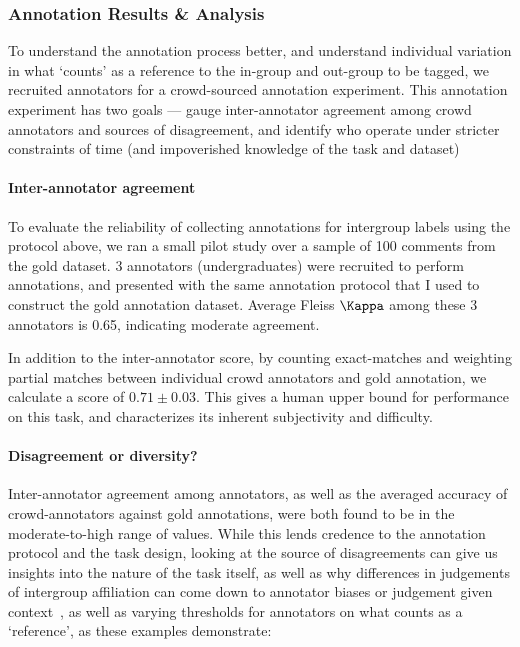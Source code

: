 

\subsubsection{Annotation Results \& Analysis}
\label{subsubsec:annotation-analysis}

To understand the annotation process better, and understand individual variation in what `counts' as a reference to the in-group and out-group to be tagged, we recruited annotators for a crowd-sourced annotation experiment. This annotation experiment has two goals --- gauge inter-annotator agreement among crowd annotators and sources of disagreement, and identify  who operate under stricter constraints of time (and impoverished knowledge of the task and dataset) 

\paragraph{Inter-annotator agreement} To evaluate the reliability of collecting annotations for intergroup labels using the protocol above, we ran a small pilot study over a sample of 100 comments from the gold dataset. 3 annotators (undergraduates) were recruited to perform annotations, and presented with the same annotation protocol that I used to construct the gold annotation dataset. Average Fleiss $\Kappa$ among these 3 annotators is  0.65, indicating moderate agreement.

In addition to the inter-annotator score, by counting exact-matches and weighting partial matches between individual crowd annotators and gold annotation, we calculate a score of $0.71 \pm 0.03$. This gives a human upper bound for performance on this task, and characterizes its inherent subjectivity and difficulty.

\paragraph{Disagreement or diversity?} Inter-annotator agreement among annotators, as well as the averaged accuracy of crowd-annotators against gold annotations, were both found to be in the moderate-to-high range of values. While this lends credence to the annotation protocol and the task design, looking at the source of disagreements can give us insights into the nature of the task itself, as well as why differences in judgements of intergroup affiliation can come down to annotator biases or judgement given context~\citep{atwell-etal-2022-role}, as well as varying thresholds for annotators on what counts as a `reference', as these examples demonstrate:


